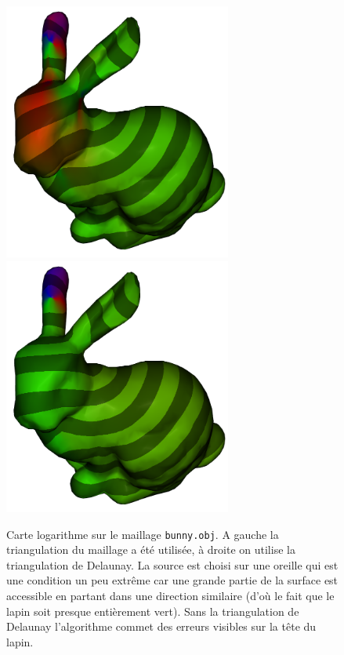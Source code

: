 \documentclass[11pt]{article}
\begin{document}
	\begin{figure}
		\centering
		\includegraphics[width=7.5cm]{log_without_delaunay.png} \; \includegraphics[width=7.5cm]{log_with_delaunay.png}
		\caption{Carte logarithme sur le maillage \texttt{bunny.obj}. A gauche la triangulation du maillage a été utilisée, à droite on utilise la triangulation de Delaunay. La source est choisi sur une oreille qui est une condition un peu extrême car une grande partie de la surface est accessible en partant dans une direction similaire (d'où le fait que le lapin soit presque entièrement vert). Sans la triangulation de Delaunay l'algorithme commet des erreurs visibles sur la tête du lapin.}
		\label{fig:log_bunny}
	\end{figure}

	\appendix
	
	
	
\end{document}
